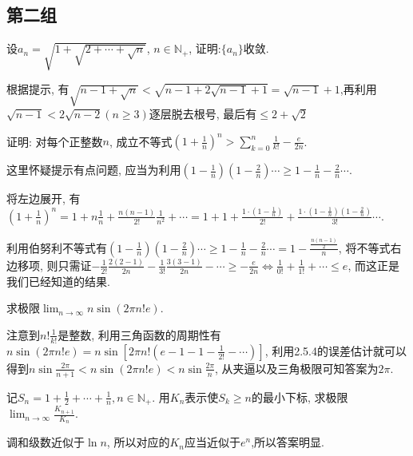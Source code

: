  \subsection{第二组}
     \begin{exercise}
         设$a_n = \sqrt{1+\sqrt{2+\cdots +\sqrt{n}}}$, $n\in \mathbb{N}_+$, 证明:$\{a_n\}$收敛.
     \end{exercise}
     \begin{solution}
         根据提示, 有$\sqrt{n-1+\sqrt{n}}<\sqrt{n-1+2\sqrt{n-1}+1}=\sqrt{n-1}+1$,再利用$\sqrt{n-1}<2\sqrt{n-2}(n\geqslant 3)$逐层脱去根号, 最后有$\leqslant2+\sqrt{2}$
     \end{solution}

     \begin{exercise}
         证明: 对每个正整数$n$, 成立不等式$\left(1+\frac{1}{n}\right)^n>\sum_{k=0}^n \frac{1}{k!}-\frac{e}{2n}$.
     \end{exercise}
     \begin{solution}
         这里怀疑提示有点问题, 应当为利用$(1-\frac{1}{n})(1-\frac{2}{n})\cdots\geqslant 1-\frac{1}{n}-\frac{2}{n}\cdots$.

         将左边展开, 有$\left(1+\frac{1}{n}\right)^n=1+n\frac{1}{n}+\frac{n(n-1)}{2!}\frac{1}{n^2}+\cdots=1+1+\frac{1\cdot (1-\frac{1}{n})}{2!}+\frac{1\cdot (1-\frac{1}{n})(1-\frac{2}{n})}{3!}\cdots$.

         利用伯努利不等式有$(1-\frac{1}{n})(1-\frac{2}{n})\cdots\geqslant 1-\frac{1}{n}-\frac{2}{n}\cdots=1-\frac{\frac{n(n-1)}{2}}{n}$, 将不等式右边移项, 则只需证$-\frac{1}{2!}\frac{2(2-1)}{2n}-\frac{1}{3!}\frac{3(3-1)}{2n}-\cdots\geqslant-\frac{e}{2n}\Longleftrightarrow\frac{1}{0!}+\frac{1}{1!}+\cdots\leqslant e$, 而这正是我们已经知道的结果.
     \end{solution}

     \begin{exercise}
         求极限$\lim_{n\to\infty}n\sin(2\pi n!e)$.
     \end{exercise}
     \begin{solution}
         注意到$n!\frac{1}{k!}$是整数, 利用三角函数的周期性有$n\sin(2\pi n!e)=n\sin[2\pi n!(e-1-1-\frac{1}{2!}-\cdots)]$, 利用2.5.4的误差估计就可以得到$n\sin\frac{2\pi}{n+1}<n\sin(2\pi n!e)<n\sin\frac{2\pi}{n}$, 从夹逼以及三角极限可知答案为$2\pi$.
     \end{solution}

     \begin{exercise}
         记$S_n=1+\frac{1}{2}+\cdots+\frac{1}{n}, n\in\mathbb{N}_+$. 用$K_n$表示使$S_k\geqslant n$的最小下标, 求极限$\lim_{n\to\infty}\frac{K_{n+1}}{K_n}$.
     \end{exercise}
     \begin{solution}
         调和级数近似于$\ln n$, 所以对应的$K_n$应当近似于$e^n$,所以答案明显.
     \end{solution}

